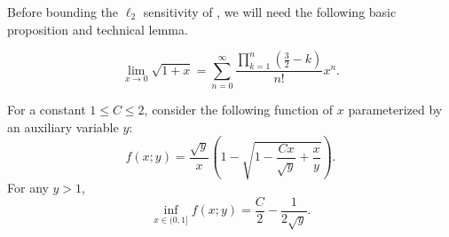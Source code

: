Before bounding the $\ell_2$ sensitivity of \ouralgo{}, we will need the following basic proposition and technical lemma.

\begin{proposition}\label{prop:taylor-sqrt}
\[
\lim_{x \to 0} \sqrt{1 + x} = \sum_{n=0}^\infty \frac{\prod_{k=1}^n \left(\frac{3}{2} - k\right)}{n!} x^n.
\]
\end{proposition}


\begin{lemma}\label{lem:gen-limit}
For a constant $1\leq C \leq 2$,
consider the following function of $x$ parameterized by an auxiliary variable $y$:
\begin{equation}\label{eq:fxy}
    f(x;y) = \frac{\sqrt{y}}{x}\left(1 - \sqrt{1 - \frac{Cx}{\sqrt{y}} + \frac{x}{y}}\right).
\end{equation}
For any $y > 1$,
\[
    \inf_{x \in (0,1]} f(x;y)
    = \frac{C}{2} - \frac{1}{2\sqrt{y}}.
\]
\end{lemma}
